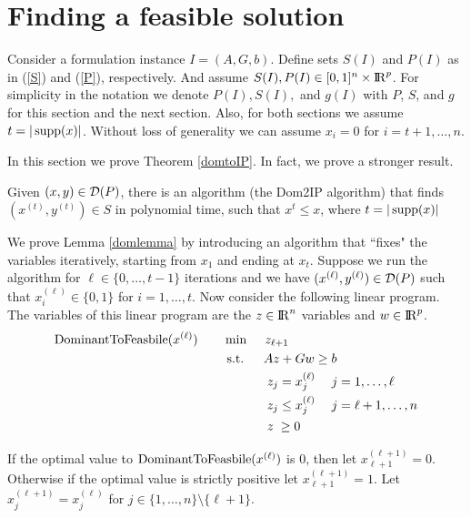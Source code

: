 \section{Finding a feasible solution}\label{domTOIP}
Consider a formulation instance $I=(A,G,b)$. Define sets $S(I)$ and $P(I)$ as in (\ref{S}) and (\ref{P}), respectively. And assume $S(I),P(I)\in [0,1]^n\times {\rm I\!R}^p$. For simplicity in the notation we denote $P(I),S(I),$ and $g(I)$ with $P$, $S$, and $g$ for this section and the next section. Also, for both sections we assume $t=|\operatorname{supp}(x)|$. Without loss of generality we can assume $x_i = 0$ for $i=t+1,\ldots,n$.

In this section we prove Theorem \ref{domtoIP}. In fact, we prove a stronger result. 
\begin{lemma}\label{domlemma}
	Given $(x,y)\in \operatorname{\mathcal{D}}(P)$, there is an algorithm (the Dom2IP algorithm) that finds $(x^{(t)},y^{(t)})\in S$ in polynomial time, such that $x^{t}\leq x$, where $t=|\operatorname{supp}(x)|$\end{lemma}

We prove Lemma \ref{domlemma} by introducing an algorithm that ``fixes" the variables iteratively, starting from $x_1$ and ending at $x_t$. Suppose we run the algorithm for $\ell\in \{0,\ldots,t-1\}$ iterations and we have $(x^{(\ell)},y^{(\ell)})\in \operatorname{\mathcal{D}}(P)$  such that $x^{(\ell)}_i\in \{0,1\}$ for $i=1,\ldots,t$. Now consider the following linear program. The variables of this linear program are the $z\in {\rm I\!R}^n$ variables and $w\in {\rm I\!R}^p$.
\begin{align}
	\DOMtoS(x^{(\ell)})\quad\quad& \min\quad \;z_{\ell+1}\\
	&\;\text{s.t.} \quad \;\;Az+ Gw\geq b \\
	&\;{\color{white}{\text{s.t.}} }\quad \;\; \; z_j = x^{(\ell)}_j \quad \; j =1,\ldots, \ell\\
	&\;{\color{white}{\text{s.t.}} }\quad \; \;\; z_j \leq x^{(\ell)}_j \quad \; j = \ell+1,\ldots,n\\
	&\;{\color{white}{\text{s.t.}} }\quad \; \;\; z\;\geq 0
\end{align}

If the optimal value to $\operatorname{DominantToFeasbile}(x^{(\ell)})$ is 0, then let $x^{(\ell+1)}_{\ell+1} = 0$. Otherwise if the optimal value is strictly positive let $x^{(\ell+1)}_{\ell+1} = 1$. Let $x^{(\ell+1)}_j = x^{(\ell)}_j$ for $j\in \{1,\ldots,n\}\setminus \{\ell+1\}$. 

